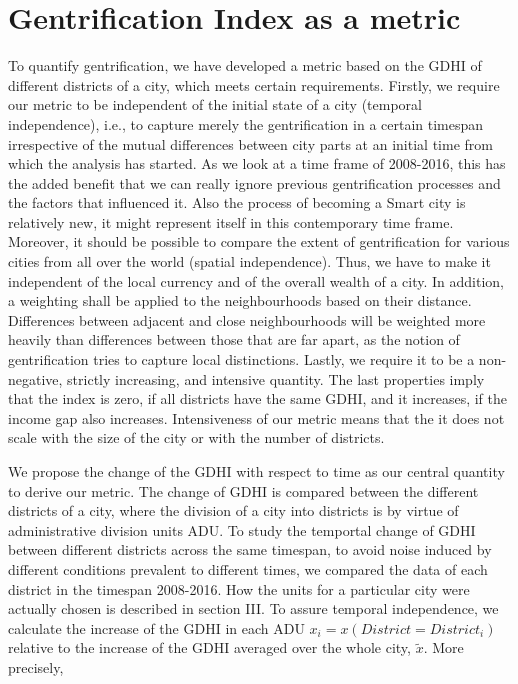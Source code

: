 \documentclass[a4paper, 10pt]{IEEEconf}      %
\begin{document}
\section{Gentrification Index as a metric}
\label{sec:Gentrification}
To quantify gentrification, we have developed a metric based on the GDHI of different districts of a city, which meets certain requirements.
Firstly, we require our metric to be independent of the initial state of a city (temporal independence),  i.e., to capture merely the
gentrification in a certain timespan irrespective of the mutual differences between city parts at an initial time from which the analysis
has started.  As we look at a time frame of 2008-2016, this has the added benefit that we can really ignore previous gentrification processes and the factors that influenced it. Also the process of becoming a Smart city is relatively new, it might represent itself in this contemporary time frame. Moreover, it should be possible to compare the extent of gentrification for various cities from all over the world (spatial independence).
Thus, we have to make it independent of the local currency and of the overall wealth of a city. In addition, a weighting shall be applied to the
neighbourhoods based on their distance. Differences between adjacent and close neighbourhoods will be weighted more heavily than differences between
those that are far apart, as the notion of gentrification tries to capture local distinctions. Lastly, we require it to be a 
non-negative, strictly increasing, and intensive quantity. The last properties imply that the index is zero, if all districts have the same GDHI, 
and it increases, if the income gap also increases. Intensiveness of our metric means that the it does not scale with the size of the city or with
the number of districts.

We propose the change of the GDHI with respect to time as our central quantity to derive our metric. The change of GDHI is compared between the different
districts of a city, where the division of a city into districts is  by virtue of administrative division units ADU. To study the temportal change of GDHI
between different districts across the same timespan, to avoid noise induced by different conditions prevalent to different times, we compared the data of
each district in the timespan 2008-2016. How the units for a particular city were actually chosen is described in section III.
To assure temporal independence, we calculate the increase of the GDHI in each ADU $x_{i}=x(District = District_i)$ relative to the increase of the GDHI 
averaged over the whole city, $\tilde{x}$. More precisely, 
\end{document}
